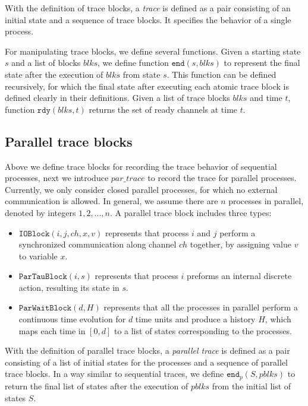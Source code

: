 \documentclass{llncs}
\newcommand{\pblks}{\mathit{pblks}}
\newcommand{\blks}{\mathit{blks}}
\begin{document}
With the definition of trace blocks, a \emph{trace} is defined as a pair consisting of an initial state and a sequence of trace blocks. It specifies the behavior of a single process.

For manipulating trace blocks, we define several functions. Given a starting state $s$ and a list of blocks $\blks$, we define function $\mathtt{end}(s,blks)$ to represent the final state after the execution of $\blks$ from state $s$. This function can be defined recursively, for which the final state after executing each atomic trace block is defined clearly in their definitions. Given a list of trace blocks $\blks$ and time $t$, function $\mathtt{rdy}(blks,t)$ returns the set of ready channels at time $t$.

\subsection{Parallel trace blocks}

Above we define trace blocks for recording the trace behavior of sequential processes, next we introduce $\mathit{par\_trace}$ to record the trace for parallel processes. Currently, we only consider closed parallel processes, for which no external communication is allowed. In general, we assume there are $n$ processes in parallel, denoted by integers $1, 2, ..., n$. A parallel trace block includes three types:

\begin{itemize}
 \item $\mathtt{IOBlock}(i,j,ch,x,v)$ represents that process $i$ and $j$ perform a synchronized communication along channel $ch$ together, by assigning value $v$ to variable $x$.
       
 \item $\mathtt{ParTauBlock}(i,s)$ represents that process $i$ preforms an internal discrete action, resulting its state in $s$.
           
 \item $\mathtt{ParWaitBlock}(d,H)$ represents that all the processes in parallel perform a continuous time evolution for $d$ time units and produce a history $H$, which maps each time in $[0,d]$ to a list of states corresponding to the processes.
\end{itemize}

With the definition of parallel trace blocks, a \emph{parallel trace} is defined as a pair consisting of a list of initial states for the processes and a sequence of parallel trace blocks. In a way similar to sequential traces, we define $\mathtt{end}_p(S,\pblks)$ to return the final list of states after the execution of $\pblks$ from the initial list of states $S$. 
\end{document}

